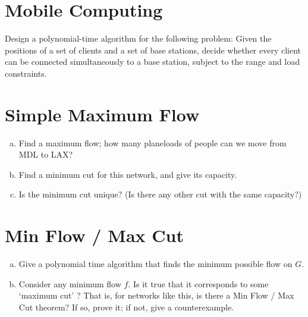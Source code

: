 \documentclass[12pt]{article}
\begin{document}
\maketitle

\section{Mobile Computing}\label{mobile computing}
Design a polynomial-time algorithm for the following problem: Given the positions of a set of clients and a set of base stations, decide whether every client can be connected simultaneously to a base station, subject to the range and load constraints.
\begin{addmargin}[2em]{2em}

\end{addmargin}

\section{Simple Maximum Flow}\label{max flow}
\begin{enumerate}[(a)]
\item Find a maximum flow; how many planeloads of people can we move from MDL to LAX?
\begin{addmargin}[2em]{2em}

\end{addmargin}
\item Find a minimum cut for this network, and give its capacity.
\begin{addmargin}[4em]{2em}

\end{addmargin}
\item Is the minimum cut unique? (Is there any other cut with the same capacity?)
\begin{addmargin}[4em]{2em}

\end{addmargin}
\end{enumerate}

\section{Min Flow / Max Cut}\label{min flow}
\begin{enumerate}[(a)]
\item Give a polynomial time algorithm that finds the minimum possible flow on $G$.
\begin{addmargin}[2em]{2em}

\end{addmargin}
\item Consider any minimum flow $f$. Is it true that it corresponds to some ‘maximum cut’ ? That is, for networks like this, is there a Min Flow / Max Cut theorem? If so, prove it; if not, give a counterexample.
\begin{addmargin}[2em]{2em}

\end{addmargin}
\end{enumerate}
\end{document}
